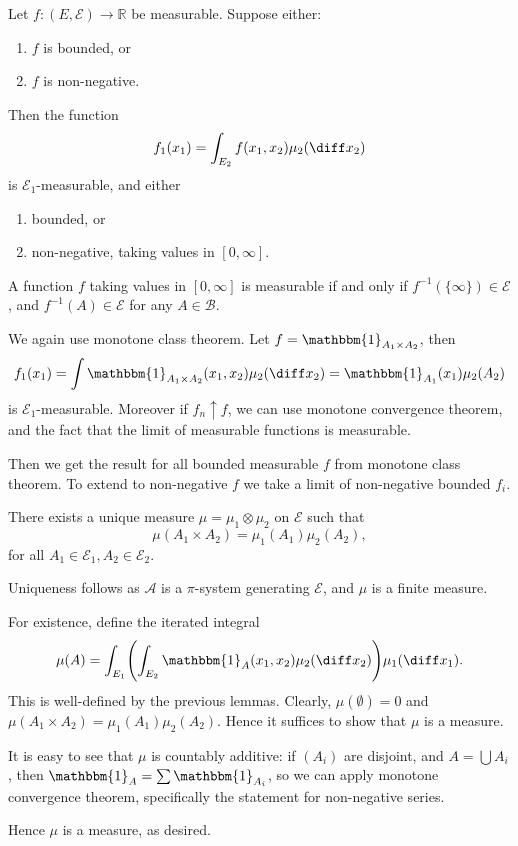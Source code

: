 \documentclass[12pt]{article}
\begin{document}
\begin{lemma}
	Let $f : (E, \mathcal{E}) \to \mathbb{R}$ be measurable. Suppose either:
	\begin{enumerate}[\normalfont(i)]
		\item $f$ is bounded, or
		\item $f$ is non-negative.
	\end{enumerate}
	Then the function
	\[
	f_1(x_1) = \int_{E_2} f(x_1,x_2) \mu_2(\diff x_2)
	\]
	is $\mathcal{E}_1$-measurable, and either
	\begin{enumerate}[\normalfont(i)]
		\item bounded, or
		\item non-negative, taking values in $[0, \infty]$.
	\end{enumerate}
\end{lemma}

\begin{remark}
	A function $f$ taking values in $[0, \infty]$ is measurable if and only if $f^{-1}(\{\infty\}) \in \mathcal{E}$, and $f^{-1}(A) \in \mathcal{E}$ for any $A \in \mathcal{B}$.
\end{remark}

\begin{proofbox}
	We again use monotone class theorem. Let $f = \mathbbm{1}_{A_1 \times A_2}$, then
	\[
	f_1(x_1) = \int \mathbbm{1}_{A_1 \times A_2}(x_1, x_2) \mu_2(\diff x_2) = \mathbbm{1}_{A_1}(x_1) \mu_2(A_2)
	\]
	is $\mathcal{E}_1$-measurable. Moreover if $f_n \uparrow f$, we can use monotone convergence theorem, and the fact that the limit of measurable functions is measurable.

	Then we get the result for all bounded measurable $f$ from monotone class theorem. To extend to non-negative $f$ we take a limit of non-negative bounded $f_i$.
\end{proofbox}

\begin{theorem}
	There exists a unique measure $\mu = \mu_1 \otimes \mu_2$ on $\mathcal{E}$ such that
	\[
	\mu(A_1 \times A_2) = \mu_1(A_1) \mu_2(A_2),
	\]
	for all $A_1 \in \mathcal{E}_1, A_2 \in \mathcal{E}_2$.
\end{theorem}

\begin{proofbox}
	Uniqueness follows as $\mathcal{A}$ is a $\pi$-system generating $\mathcal{E}$, and $\mu$ is a finite measure.

	For existence, define the iterated integral
	\[
	\mu(A) = \int_{E_1} \Biggl( \int_{E_2} \mathbbm{1}_{A}(x_1, x_2) \mu_2(\diff x_2) \Biggr) \mu_1(\diff x_1).
	\]
	This is well-defined by the previous lemmas. Clearly, $\mu(\emptyset) = 0$ and $\mu(A_1 \times A_2) = \mu_1(A_1) \mu_2(A_2)$. Hence it suffices to show that $\mu$ is a measure.

	It is easy to see that $\mu$ is countably additive: if $(A_i)$ are disjoint, and $A = \bigcup A_i$, then $\mathbbm{1}_{A} = \sum \mathbbm{1}_{A_i}$, so we can apply monotone convergence theorem, specifically the statement for non-negative series.

	Hence $\mu$ is a measure, as desired.
\end{proofbox}
\end{document}
